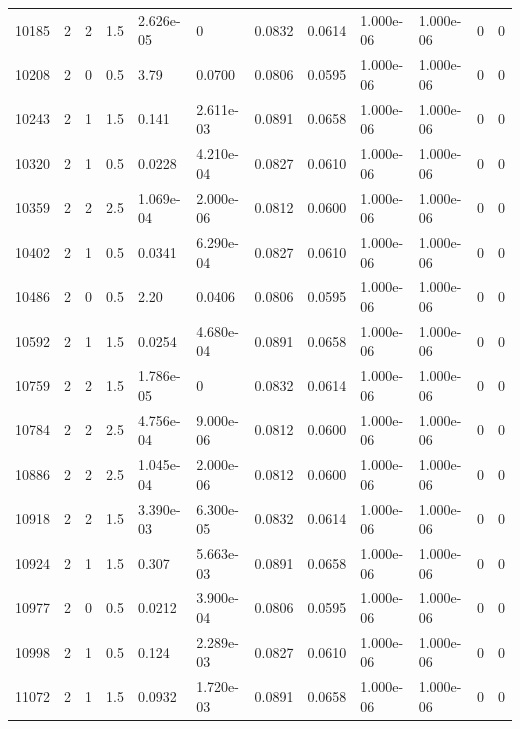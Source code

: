 \documentclass[preview]{standalone}
\begin{document}
{{{{\begin{tabular}{L{1.2cm}C{1.2cm} C{0.3cm}C{0.5cm} C{1.4cm}C{1.4cm} C{1.4cm}C{1.4cm} C{1.6cm}C{1.6cm} C{1.6cm}C{1.6cm}}
  10185  &     2  & 2     & 1.5 &  2.626e-05  & 0  &  0.0832&   0.0614& 1.000e-06 & 1.000e-06   &  0 & 0  \\ 
  10208  &     2  & 0     & 0.5 &  3.79  & 0.0700  &  0.0806&   0.0595& 1.000e-06 & 1.000e-06   &  0 & 0  \\ 
  10243  &     2  & 1     & 1.5 &  0.141  & 2.611e-03  &  0.0891&   0.0658& 1.000e-06 & 1.000e-06   &  0 & 0  \\ 
  10320  &     2  & 1     & 0.5 &  0.0228  & 4.210e-04  &  0.0827&   0.0610& 1.000e-06 & 1.000e-06   &  0 & 0  \\ 
  10359  &     2  & 2     & 2.5 &  1.069e-04  & 2.000e-06  &  0.0812&   0.0600& 1.000e-06 & 1.000e-06   &  0 & 0  \\ 
  10402  &     2  & 1     & 0.5 &  0.0341  & 6.290e-04  &  0.0827&   0.0610& 1.000e-06 & 1.000e-06   &  0 & 0  \\ 
  10486  &     2  & 0     & 0.5 &  2.20  & 0.0406  &  0.0806&   0.0595& 1.000e-06 & 1.000e-06   &  0 & 0  \\ 
  10592  &     2  & 1     & 1.5 &  0.0254  & 4.680e-04  &  0.0891&   0.0658& 1.000e-06 & 1.000e-06   &  0 & 0  \\ 
  10759  &     2  & 2     & 1.5 &  1.786e-05  & 0  &  0.0832&   0.0614& 1.000e-06 & 1.000e-06   &  0 & 0  \\ 
  10784  &     2  & 2     & 2.5 &  4.756e-04  & 9.000e-06  &  0.0812&   0.0600& 1.000e-06 & 1.000e-06   &  0 & 0  \\ 
  10886  &     2  & 2     & 2.5 &  1.045e-04  & 2.000e-06  &  0.0812&   0.0600& 1.000e-06 & 1.000e-06   &  0 & 0  \\ 
  10918  &     2  & 2     & 1.5 &  3.390e-03  & 6.300e-05  &  0.0832&   0.0614& 1.000e-06 & 1.000e-06   &  0 & 0  \\ 
  10924  &     2  & 1     & 1.5 &  0.307  & 5.663e-03  &  0.0891&   0.0658& 1.000e-06 & 1.000e-06   &  0 & 0  \\ 
  10977  &     2  & 0     & 0.5 &  0.0212  & 3.900e-04  &  0.0806&   0.0595& 1.000e-06 & 1.000e-06   &  0 & 0  \\ 
  10998  &     2  & 1     & 0.5 &  0.124  & 2.289e-03  &  0.0827&   0.0610& 1.000e-06 & 1.000e-06   &  0 & 0  \\ 
  11072  &     2  & 1     & 1.5 &  0.0932  & 1.720e-03  &  0.0891&   0.0658& 1.000e-06 & 1.000e-06   &  0 & 0  \\ 
\hline 
\end{tabular} 

}}}}
\end{document}
